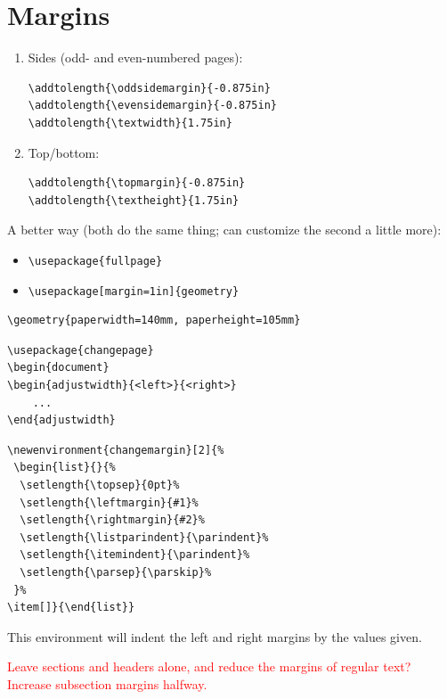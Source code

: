 \documentclass{article}
\begin{document}
\section{Margins}
\begin{enumerate}
    \item Sides (odd- and even-numbered pages):
\begin{lstlisting}
\addtolength{\oddsidemargin}{-0.875in}
\addtolength{\evensidemargin}{-0.875in}
\addtolength{\textwidth}{1.75in}
\end{lstlisting}
    \item Top/bottom:
\begin{lstlisting}
\addtolength{\topmargin}{-0.875in}
\addtolength{\textheight}{1.75in}
\end{lstlisting}
\end{enumerate}
A better way (both do the same thing;
can customize the second a little more):
\begin{itemize}
    \item \verb|\usepackage{fullpage}|
    \item \verb|\usepackage[margin=1in]{geometry}|
\end{itemize}

\begin{lstlisting}
\geometry{paperwidth=140mm, paperheight=105mm}
\end{lstlisting}

\begin{lstlisting}
\usepackage{changepage}
\begin{document}
\begin{adjustwidth}{<left>}{<right>}
    ...
\end{adjustwidth}
\end{lstlisting}

\begin{lstlisting}
\newenvironment{changemargin}[2]{%
 \begin{list}{}{%
  \setlength{\topsep}{0pt}%
  \setlength{\leftmargin}{#1}%
  \setlength{\rightmargin}{#2}%
  \setlength{\listparindent}{\parindent}%
  \setlength{\itemindent}{\parindent}%
  \setlength{\parsep}{\parskip}%
 }%
\item[]}{\end{list}}
\end{lstlisting}
This environment will indent the left and right margins by the values given.

\textcolor{red}{Leave sections and headers alone, and reduce the margins of
regular text? Increase subsection margins halfway.}
\end{document}
